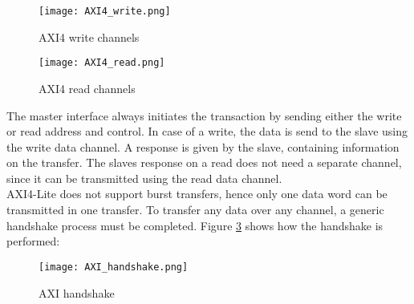\begin{figure}[H]
	\centering
	\texttt{[image: AXI4\_write.png]}
	\caption{\ac{AXI}4 write channels \cite{AMBA:AXI}}
	\label{fig:AXI_channels_write}
\end{figure}

\begin{figure}[H]
	\centering
	\texttt{[image: AXI4\_read.png]}
	\caption{\ac{AXI}4 read channels \cite{AMBA:AXI}}
	\label{fig:AXI_channels_read}
\end{figure}

The master interface always initiates the transaction by sending either the write or read address and control. In case of a write, the data is send to the slave using the write data channel. A response is given by the slave, containing information on the transfer. The slaves response on a read does not need a separate channel, since it can be transmitted using the read data channel.\\
AXI4-Lite does not support burst transfers, hence only one data word can be transmitted in one transfer. To transfer any data over any channel, a generic handshake process must be completed. Figure \ref{fig:AXI_handshake} shows how the handshake is performed:

\begin{figure}[H]
	\centering
	\texttt{[image: AXI\_handshake.png]}
	\caption{\ac{AXI} handshake \cite{AMBA:AXI}}
	\label{fig:AXI_handshake}
\end{figure}
 
